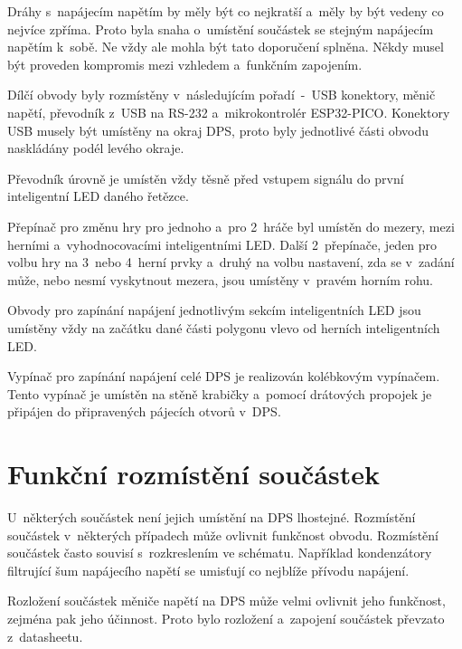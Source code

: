   Dráhy s~napájecím napětím by měly být co nejkratší a~měly by být vedeny co nejvíce zpříma. Proto byla snaha o~umístění součástek
  se stejným napájecím napětím k~sobě. Ne vždy ale mohla být tato doporučení splněna. Někdy musel být proveden kompromis mezi vzhledem a~funkčním 
  zapojením. 

  Dílčí obvody byly rozmístěny v~následujícím pořadí~-~USB konektory, měnič napětí, převodník z~USB 
  na RS-232 a~mikrokontrolér ESP32-PICO. Konektory USB musely být umístěny na okraj DPS, proto byly jednotlivé části obvodu naskládány podél levého okraje.

  Převodník úrovně je umístěn vždy těsně před vstupem signálu do první inteligentní LED daného řetězce.

  Přepínač pro změnu hry pro jednoho a~pro 2~hráče byl umístěn do mezery, mezi herními a~vyhodnocovacími inteligentními LED. Další 2~přepínače, jeden 
  pro volbu hry na 3~nebo 4~herní prvky a~druhý na volbu nastavení, zda se v~zadání může, nebo nesmí vyskytnout mezera, jsou umístěny v~pravém 
  horním rohu. 

  Obvody pro zapínání napájení jednotlivým sekcím inteligentních LED jsou umístěny vždy na začátku dané části polygonu vlevo od herních inteligentních
  LED.

  Vypínač pro zapínání napájení celé DPS je realizován kolébkovým vypínačem. Tento vypínač je umístěn na stěně krabičky a~pomocí drátových propojek 
  je připájen do připravených pájecích otvorů v~DPS.

  \section{Funkční rozmístění součástek}
  U~některých součástek není jejich umístění na DPS lhostejné. Rozmístění součástek v~některých případech může ovlivnit funkčnost obvodu. 
  Rozmístění součástek často souvisí s~rozkreslením ve schématu. Například kondenzátory filtrující šum napájecího napětí se umisťují co nejblíže přívodu 
  napájení.

  Rozložení součástek měniče napětí na DPS může velmi ovlivnit jeho funkčnost, zejména pak jeho účinnost. Proto bylo rozložení a~zapojení součástek 
  převzato z~datasheetu.

